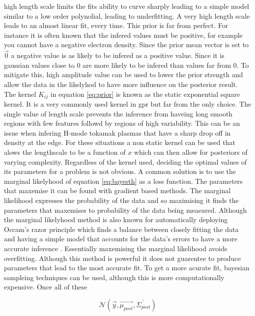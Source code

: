 high length scale limits the fits ability to curve sharply leading to a simple model similar to a low order polynolial, leading to underfitting. A very high length scale leads to an almost linear fit, every time. This prior is far from perfect. For instance it is often known that the infered values must be positive, for example you cannot have a negative electron density. Since the prior mean vector is set to $\Vec{0}$ a negative value is as likely to be infered as a positive value. Since it is gaussian values close to 0 are more likely to be infered than values far from 0. To mitigate this, high amplitude value can be used to lower the prior strength and allow the data in the likelyhod to have more influence on the posterior result. The kernel $K_{ij}$ in equation \ref{eq:prior} is known as the static exponential square kernel. It is a very commonly used kernel in \gls{gpr} but far from the only choice. The single value of length scale prevents the inference from haveing long smooth regions with few features followd by regions of high variability. This can be an issue when infering H-mode tokamak plasmas that have a sharp drop off in density at the edge. For these situations a non static kernel can be used that alows the lengthscale to be a function of $x$ which can then allow for posteriors of varying complexity. Regardless of the kernel used, deciding the optimal values of its parameters for a problem is not obvious. A common solution is to use the marginal likelyhood of equation \ref{eq:bayesth} as a loss function. The parameters that maxemise it can be found with gradient based methods. The marginal likelihood expresses the probability of the data and so maximising it finds the parameters that maxemises to probability of the data being measured. Although the marginal likelyhood method is also known for automatically deploying Occam's razor principle which finds a balance between closely fitting the data and having a simple model that accounts for the data's errors to have a more accurate inference \cite{oscraz} \cite{gp4ml}. Essentially maxemising the marginal likelihood avoids overfitting. Although this method is powerful it does not guarentee to produce parameters that lead to the most accurate fit. To get a more acurate fit, bayesian sampleing techniques can be used, although this is more computationally expensive. Once all of these 

\begin{equation}
  \mathcal{N}(\Vec{y}, \Vec{\mu_{post}}, \overline{\overline{\Sigma_{post}}})
  \label{eq:posterior}
\end{equation}

